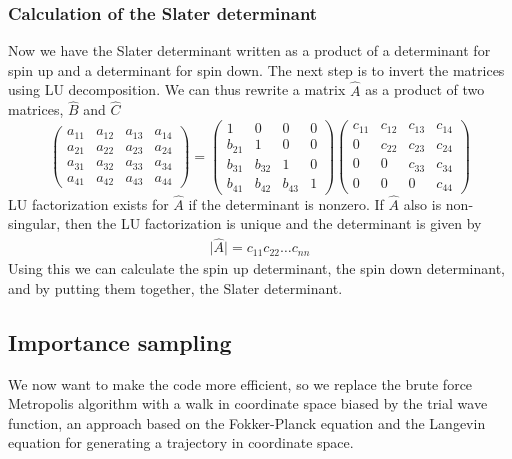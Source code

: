 \documentclass[x11names]{article}
\begin{document}
		\subsubsection{Calculation of the Slater determinant}
			Now we have the Slater determinant written as a product of a determinant
			for spin up and a determinant for spin down. The next step is to invert
			the matrices using LU decomposition. We can thus rewrite a matrix
			$\hat{A}$ as a product of two matrices, $\hat{B}$ and $\hat{C}$
			\[
			\left(\begin{array}{cccc}
			a_{11} & a_{12} & a_{13} & a_{14}\\
			a_{21} & a_{22} & a_{23} & a_{24}\\
			a_{31} & a_{32} & a_{33} & a_{34}\\
			a_{41} & a_{42} & a_{43} & a_{44}
			\end{array}\right)=\left(\begin{array}{cccc}
			1 & 0 & 0 & 0\\
			b_{21} & 1 & 0 & 0\\
			b_{31} & b_{32} & 1 & 0\\
			b_{41} & b_{42} & b_{43} & 1
			\end{array}\right)\left(\begin{array}{cccc}
			c_{11} & c_{12} & c_{13} & c_{14}\\
			0 & c_{22} & c_{23} & c_{24}\\
			0 & 0 & c_{33} & c_{34}\\
			0 & 0 & 0 & c_{44}
			\end{array}\right)
			\]
			LU factorization exists for $\hat{A}$ if the determinant is nonzero.
			If $\hat{A}$ also is non-singular, then the LU factorization is unique
			and the determinant is given by
			\begin{align}
				\vert\hat{A}\vert=c_{11}c_{22}\dots c_{nn}
			\end{align}
			Using this we can calculate the spin up determinant, the spin down
			determinant, and by putting them together, the Slater determinant.

	\subsection{Importance sampling}
		We now want to make the code more efficient, so we replace the brute
		force Metropolis algorithm with a walk in coordinate space biased
		by the trial wave function, an approach based on the Fokker-Planck
		equation and the Langevin equation for generating a trajectory in
		coordinate space.
\end{document}
